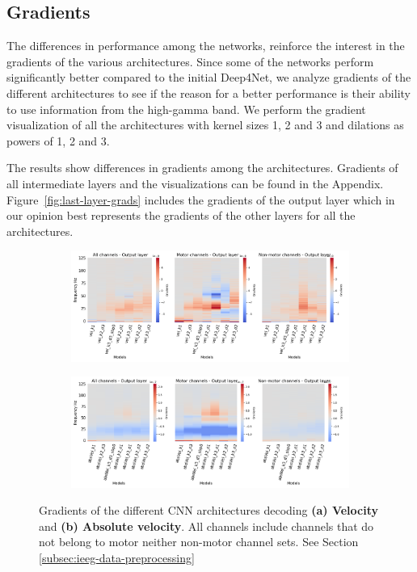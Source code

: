 \subsection{Gradients}\label{subsec:gradients}
The differences in performance among the networks, reinforce the interest in the gradients of the various architectures.
Since some of the networks perform significantly better compared to the initial Deep4Net, we analyze gradients of the different architectures to see if the reason for a better performance is their ability to use information from the high-gamma band.
We perform the gradient visualization of all the architectures with kernel sizes 1, 2 and 3 and dilations as powers of 1, 2 and 3.

The results show differences in gradients among the architectures.
Gradients of all intermediate layers and the visualizations can be found in the Appendix.
Figure~\ref{fig:last-layer-grads} includes the gradients of the output layer which in our opinion best represents the gradients of the other layers for all the architectures.

\begin{figure}[!htpb]
\centering
\begin{subfigure}[b]{\textwidth}
   \includegraphics[width=1\linewidth]{img/ch4/vel-last-layer-grads}
   \caption{}
\end{subfigure}\label{fig:absVel-last-layer-grads}

\begin{subfigure}[b]{\textwidth}
   \includegraphics[width=1\linewidth]{img/ch4/absVel-last-layer-grads}
   \caption{}
\end{subfigure}\label{fig:vel-last-layer-grads}
\caption[]{Gradients of the different CNN architectures decoding \textbf{(a) Velocity} and \textbf{(b) Absolute velocity}. All channels include channels that do not belong to motor neither non-motor channel sets. See Section \ref{subsec:ieeg-data-preprocessing}}
\end{figure}\label{fig:last-layer-grads}

